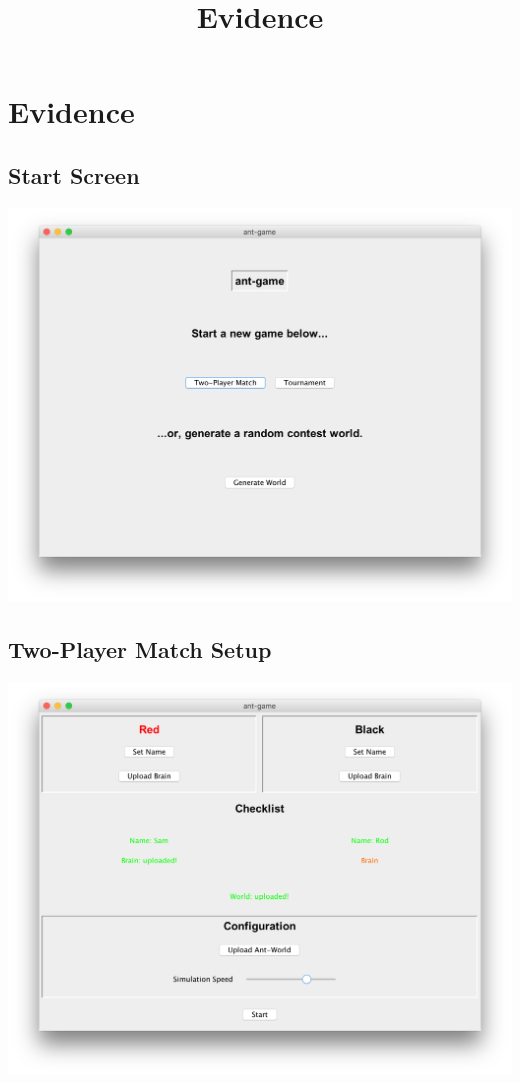 \documentclass[11pt]{article}
\title{Evidence}
\date{}
\begin{document}
\maketitle
\tableofcontents
\newpage
\section{Evidence}

\subsection{Start Screen}

\begin{center}
\includegraphics[width=\textwidth]{start-screen}
\end{center}

\subsection{Two-Player Match Setup}

\begin{center}
\includegraphics[width=\textwidth]{two-player-match-setup}
\end{center}
\end{document}
